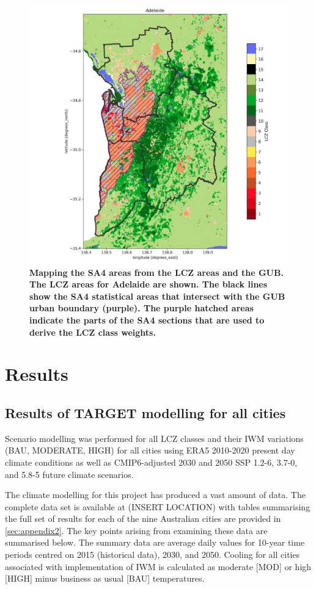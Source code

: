 \documentclass[utf8]{frontiersSCNS} %
\begin{document}
\begin{figure}
\centering
\includegraphics[trim={0 0 0 0},clip,scale=0.25]{images/image6.jpg}
\caption{\bf Mapping the SA4 areas from the LCZ areas and the GUB.  The LCZ areas for Adelaide are shown. The black lines show the SA4 statistical areas that intersect with the GUB urban boundary (purple). The purple hatched areas indicate the parts of the SA4 sections that are used to derive the LCZ class weights.}
 \label{fig:sa4maps}
\end{figure}

\section{Results}\label{sec:results}
\subsection{Results of TARGET modelling for all cities}\label{sec:results1}

Scenario modelling was performed for all LCZ classes and their IWM variations (BAU, MODERATE, HIGH) for all cities using ERA5 2010-2020 present day climate conditions as well as CMIP6-adjusted 2030 and 2050 SSP 1.2-6, 3.7-0, and 5.8-5 future climate scenarios. 

The climate modelling for this project has produced a vast amount of data.  The complete data set is available at (INSERT LOCATION) with tables summarising the full set of results for each of the nine Australian cities are provided in \ref{sec:appendix2}. The key points arising from examining these data are summarised below. The summary data are average daily values for 10-year time periods centred on 2015 (historical data), 2030, and 2050. Cooling for all cities associated with implementation of IWM is calculated as moderate [MOD] or high [HIGH] minus business as usual [BAU] temperatures.
\end{document}
